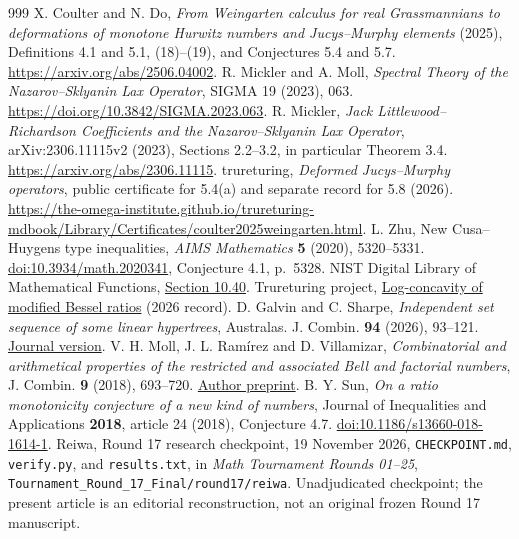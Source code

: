 \documentclass[11pt,a4paper]{article}
\begin{document}
\begin{thebibliography}{999}
X. Coulter and N. Do, \emph{From Weingarten calculus for real Grassmannians to deformations of monotone Hurwitz numbers and Jucys--Murphy elements} (2025), Definitions 4.1 and 5.1, (18)--(19), and Conjectures 5.4 and 5.7. \url{https://arxiv.org/abs/2506.04002}.
R. Mickler and A. Moll, \emph{Spectral Theory of the Nazarov--Sklyanin Lax Operator}, SIGMA 19 (2023), 063. \url{https://doi.org/10.3842/SIGMA.2023.063}.
R. Mickler, \emph{Jack Littlewood--Richardson Coefficients and the Nazarov--Sklyanin Lax Operator}, arXiv:2306.11115v2 (2023), Sections 2.2--3.2, in particular Theorem 3.4. \url{https://arxiv.org/abs/2306.11115}.
trureturing, \emph{Deformed Jucys--Murphy operators}, public certificate for 5.4(a) and separate record for 5.8 (2026). \url{https://the-omega-institute.github.io/trureturing-mdbook/Library/Certificates/coulter2025weingarten.html}.
L. Zhu, New Cusa--Huygens type inequalities,
\emph{AIMS Mathematics} \textbf{5} (2020), 5320--5331.
\href{https://doi.org/10.3934/math.2020341}{doi:10.3934/math.2020341},
Conjecture 4.1, p.~5328.
NIST Digital Library of Mathematical Functions,
\href{https://dlmf.nist.gov/10.40}{Section 10.40}.
Trureturing project,
\href{https://www.trureturing.org/research/karp-vishnyakova-zhang-2025-bessel-ratio-log-concavity/}{Log-concavity of modified Bessel ratios} (2026 record).
D. Galvin and C. Sharpe, \emph{Independent set sequence of
some linear hypertrees}, Australas. J. Combin. \textbf{94} (2026),
93--121. \href{https://ajc.maths.uq.edu.au/pdf/94/ajc_v94_p093.pdf}{Journal version}.
V. H. Moll, J. L. Ram\'irez and D. Villamizar,
\emph{Combinatorial and arithmetical properties of the restricted and
associated Bell and factorial numbers}, J. Combin. \textbf{9} (2018),
693--720. \href{https://arxiv.org/abs/1707.08138}{Author preprint}.
B. Y. Sun,
\emph{On a ratio monotonicity conjecture of a new kind of numbers},
Journal of Inequalities and Applications \textbf{2018}, article 24
(2018), Conjecture 4.7.
\href{https://doi.org/10.1186/s13660-018-1614-1}
{doi:10.1186/s13660-018-1614-1}.
Reiwa, Round 17 research checkpoint, 19 November 2026,
\texttt{CHECKPOINT.md}, \texttt{verify.py}, and \texttt{results.txt},
in \emph{Math Tournament Rounds 01--25},
\texttt{Tournament\_Round\_17\_Final/round17/reiwa}.
Unadjudicated checkpoint; the present article is an editorial
reconstruction, not an original frozen Round 17 manuscript.

\end{thebibliography}
\end{document}
